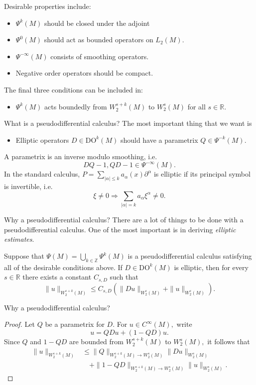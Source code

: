 \documentclass{beamer}
\numberwithin{equation}{section}
\theoremstyle{plain}
\theoremstyle{plain}
\theoremstyle{definition}
\theoremstyle{plain}
\theoremstyle{plain}
\theoremstyle{definition}
\newcommand{\Rl}{\mathbb{R}}
\newcommand{\Itgr}{\mathbb{Z}}
\begin{document}
\begin{frame}
  Desirable properties include:
  \begin{itemize}
    \item{} $\Psi^k(M)$ should be closed under the adjoint
    \item{} $\Psi^0(M)$ should act as bounded operators on $L_2(M).$
    \item{} $\Psi^{-\infty}(M)$ consists of smoothing operators.
    \item{} Negative order operators should be compact.
  \end{itemize}\pause
  The final three conditions can be included in:
  \begin{itemize}
    \item{} $\Psi^k(M)$ acts boundedly from $W^{s+k}_2(M)$ to $W^{s}_2(M)$ for all $s\in \Rl.$
  \end{itemize}
\end{frame}

\begin{frame}{What is a pseudodifferential calculus?}
  The most important thing that we want is 
  \begin{itemize}
    \item{} Elliptic operators $D\in \mathrm{DO}^k(M)$ should have a parametrix $Q \in \Psi^{-k}(M).$
  \end{itemize}
  A parametrix is an inverse modulo smoothing, i.e.
  \[
    DQ-1,QD-1 \in \Psi^{-\infty}(M).
  \]
  \pause
  In the standard calculus, $P=\sum_{|\alpha|\leq k} a_{\alpha}(x)\partial^{\alpha}$ is elliptic if its principal symbol is invertible, i.e.
  \[
    \xi\neq 0\Rightarrow \sum_{|\alpha|=k} a_{\alpha}\xi^{\alpha} \neq 0.
  \]
\end{frame}

\begin{frame}{Why a pseudodifferential calculus?}
  There are a lot of things to be done with a pseudodifferential calculus. One of the most important is in deriving \emph{elliptic estimates}.
  \begin{lemma}
    Suppose that $\Psi(M) = \bigcup_{k\in \Itgr} \Psi^k(M)$ is a pseudodifferential calculus satisfying all of the desirable conditions above. If $D\in \mathrm{DO}^k(M)$ is elliptic, then for every $s \in \Rl$ there exists a constant $C_{s,D}$ such that
    \[
      \|u\|_{W^{s+k}_2(M)} \leq C_{s,D}(\|Du\|_{W^s_2(M)} + \|u\|_{W^{s}_2(M)}).
    \]
  \end{lemma}
\end{frame}
\begin{frame}{Why a pseudodifferential calculus?}
  \begin{proof}
    Let $Q$ be a parametrix for $D.$ For $u\in C^\infty(M),$ write
    \[
        u = QDu+(1-QD)u.
    \]  
    \pause
    Since $Q$ and $1-QD$ are bounded from $W^{s+k}_2(M)$ to $W^{s}_2(M),$ it follows that
    \begin{align*}
        \|u\|_{W^{s+k}_2(M)} &\leq \|Q\|_{W^{s+k}_2(M)\to W^s_2(M)}\|Du\|_{W^s_2(M)}\\
        &\quad +\|1-QD\|_{W^{s+k}_2(M)\to W^s_2(M)}\|u\|_{W^s_2(M)}.
    \end{align*}
  \end{proof}
\end{frame}
\end{document}
